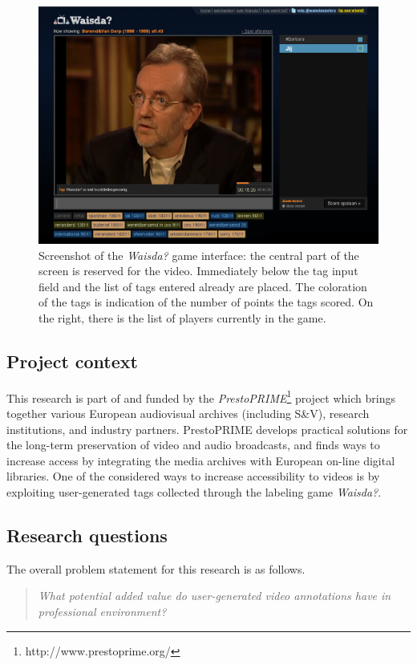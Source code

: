\begin{footnotesize}
\begin{figure}[t!]
\centering
\includegraphics[scale=0.5]{intro:waisda_game}
\caption{Screenshot of the \textit{Waisda?} game interface: the central part of the screen is reserved for the video. Immediately below the tag input field and the list of tags entered already are placed. The coloration of the tags is indication of the number of points the tags scored.  On the right, there is the list of players currently in the game.}
\label{fig:waisda}
\end{figure}
\end{footnotesize}

\subsection{Project context}
This research is part of and funded by the \textit{PrestoPRIME}\footnote{http://www.prestoprime.org/} project which brings together various European audiovisual archives (including S\&V), research institutions, and industry partners. PrestoPRIME develops practical solutions for the long-term preservation of video and audio broadcasts, and finds ways to increase access by integrating the media archives with European on-line digital libraries. One of the considered ways to increase accessibility to videos is by exploiting user-generated tags collected through the labeling game \textit{Waisda?}.

\subsection{Research questions}\label{sec:research-questions}
The overall problem statement for this research is as follows.
\begin{quote}
\textit{What potential added value do user-generated video annotations have in professional environment?}
\end{quote}

